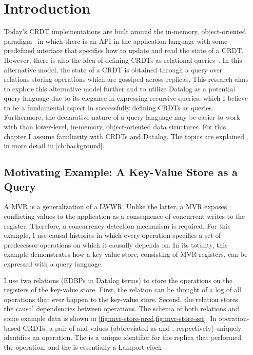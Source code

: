 
\chapter{Introduction}\label{ch:intro}

Today's \ac{CRDT} implementations are built around the in-memory,
object-oriented paradigm~\cite{laddad2022keep} in which there is an API
in the application language with some predefined interface that
specifies how to update and read the state of a \ac{CRDT}.
However, there is also the idea of defining \acp{CRDT}
as relational queries~\cite{kleppmann2018data}.
In this alternative model, the state of a \ac{CRDT} is obtained through a query over
relations storing operations which are gossiped across replicas.
This research aims to explore this alternative model further and
to utilize Datalog as a potential query language due to its elegance in
expressing recursive queries, which I believe to be a fundamental aspect in
successfully defining \acp{CRDT} as queries.
Furthermore, the declarative nature of a query language may be easier to work
with than lower-level, in-memory, object-oriented data structures.
For this chapter I assume familiarity with \acp{CRDT} and Datalog.
The topics are explained in more detail in \autoref{ch:background}.

\section{Motivating Example: A Key-Value Store as a Query}\label{sec:motivating-example}

A \ac{MVR} is a generalization of a \ac{LWWR}.
Unlike the latter, a \ac{MVR} exposes conflicting values to the application
as a consequence of concurrent writes to the register.
Therefore, a concurrency detection mechanism is required.
For this example, I use causal histories in which every operation specifies
a set of predecessor operations on which it causally depends on\footnotemark{}.
In its totality, this example demonstrates how a key value store,
consisting of MVR registers, can be expressed with a query language.


I use two relations (\acp{EDBP} in Datalog terms) to store the operations
on the registers of the key-value store.
First, the  relation can be thought of a log of all operations
that ever happen to the key-value store.
Second, the  relation stores the causal dependencies between operations.
The schema of both relations and some example data is shown in
\ref{fig:mvr-store-pred,fig:mvr-store-set}.
In operation-based \acp{CRDT}, a pair of  and  values
(abbreviated as  and , respectively) uniquely
identifies an operation.
The  is a unique identifier for the replica that performed the
operation, and the  is essentially a Lamport clock~\cite{lamport2019time}.

